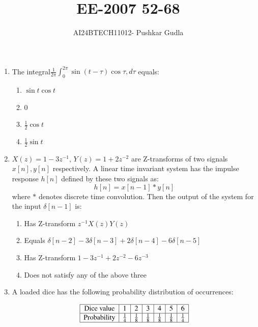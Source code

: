 \documentclass[journal,12pt,onecolumn]{IEEEtran}
\theoremstyle{remark}
\begin{document}

\vspace{3cm}

\title{\textbf{EE-2007 52-68}}
\author{AI24BTECH11012- Pushkar Gudla}
\maketitle
\bigskip

\renewcommand{\thefigure}{\theenumi}
\renewcommand{\thetable}{\theenumi}
\setlength{\columnsep}{2.5em}

\begin{enumerate}
    \item The integral$
    \frac{1}{2\pi} \int_{0}^{2\pi} \sin(t - \tau)\cos \tau , d\tau$
    equals:
    
    \begin{enumerate}
        \item $\sin t \cos t$
        \item $0$
        \item $\frac{1}{2} \cos t$
        \item $\frac{1}{2} \sin t$
    \end{enumerate}
    
    \item $X(z) = 1 - 3z^{-1}, \, Y(z) = 1 + 2z^{-2}$ are Z-transforms of two signals $x[n], y[n]$ respectively. A linear time invariant system has the impulse response $h[n]$ defined by these two signals as:
 \[
    h[n] = x[n - 1] * y[n]
 \]
    where $*$ denotes discrete time convolution. Then the output of the system for the input $\delta[n - 1]$ is:
    
    \begin{enumerate}
        \item Has Z-transform $z^{-1} X(z)Y(z)$
        \item Equals $\delta[n - 2] - 3\delta[n - 3] + 2\delta[n - 4] - 6\delta[n - 5]$
        \item Has Z-transform $1 - 3z^{-1} + 2z^{-2} - 6z^{-3}$
        \item Does not satisfy any of the above three
    \end{enumerate}
    
    \item A loaded dice has the following probability distribution of occurrences:
    
    \[
    \begin{array}{|c|c|c|c|c|c|c|}
    \hline
    \text{Dice value} & 1 & 2 & 3 & 4 & 5 & 6 \\
    \hline
    \text{Probability} & \frac{1}{4} & \frac{1}{8} & \frac{1}{8} & \frac{1}{8} & \frac{1}{8} & \frac{1}{4} \\
    \hline
    \end{array}
    \]
    

\end{enumerate}
\end{document}
